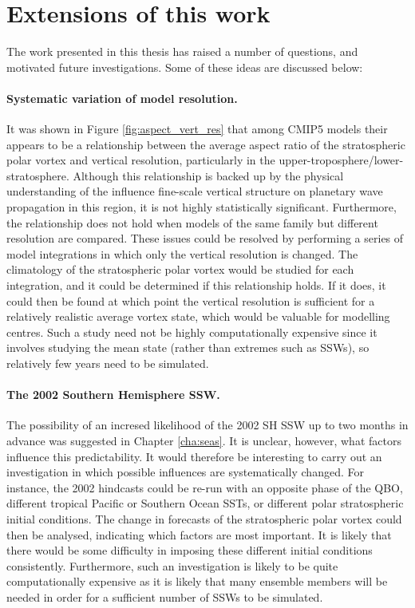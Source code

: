 
\section{Extensions of this work}

The work presented in this thesis has raised a number of questions, and
motivated future investigations. Some of these ideas are discussed below:

\paragraph{Systematic variation of model resolution.} It was shown in Figure
\ref{fig:aspect_vert_res} that among CMIP5 models their appears to be a
relationship between the average aspect ratio of the stratospheric polar vortex
and vertical resolution, particularly in the
upper-troposphere/lower-stratosphere. Although this relationship is backed up by
the physical understanding of the influence fine-scale vertical structure on
planetary wave propagation in this region, it is not highly statistically
significant. Furthermore, the relationship does not hold when models of the same
family but different resolution are compared. These issues could be resolved by
performing a series of model integrations in which only the vertical resolution
is changed. The climatology of the stratospheric polar vortex would be studied
for each integration, and it could be determined if this relationship holds. If
it does, it could then be found at which point the vertical resolution is
sufficient for a relatively realistic average vortex state, which would be
valuable for modelling centres. Such a study need not be highly computationally
expensive since it involves studying the mean state (rather than extremes such
as SSWs), so relatively few years need to be simulated.


\paragraph{The 2002 Southern Hemisphere SSW.} The possibility of an incresed
likelihood of the 2002 SH SSW up to two months in advance was suggested in
Chapter \ref{cha:seas}. It is unclear, however, what factors influence this
predictability. It would therefore be interesting to carry out an investigation
in which possible influences are systematically changed. For instance, the 2002
hindcasts could be re-run with an opposite phase of the QBO, different tropical
Pacific or Southern Ocean SSTs, or different polar stratospheric initial
conditions. The change in forecasts of the stratospheric polar vortex could then
be analysed, indicating which factors are most important. It is likely that
there would be some difficulty in imposing these different initial conditions
consistently. Furthermore, such an investigation is likely to be quite
computationally expensive as it is likely that many ensemble members will be
needed in order for a sufficient number of SSWs to be simulated.

